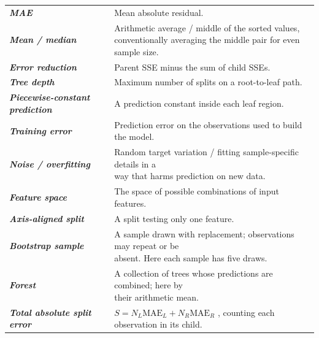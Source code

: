 \documentclass[10pt]{article}
\begin{document}
\begin{longtable}{l|l}
\textbf{\textit{MAE}} & Mean absolute residual. \\[1.5pt]
\textbf{\textit{Mean / median}} & \shortstack[l]{Arithmetic average / middle of the sorted values, \\ conventionally averaging the middle pair for even sample size.} \\[1.5pt]
\textbf{\textit{Error reduction}} & Parent SSE minus the sum of child SSEs. \\[1.5pt]
\textbf{\textit{Tree depth}} & Maximum number of splits on a root-to-leaf path. \\[1.5pt]
\textbf{\textit{Piecewise-constant prediction}} & A prediction constant inside each leaf region. \\[1.5pt]
\textbf{\textit{Training error}} & Prediction error on the observations used to build the model. \\[1.5pt]
\textbf{\textit{Noise / overfitting}} & \shortstack[l]{Random target variation / fitting sample-specific details in a \\ way that harms prediction on new data.} \\[1.5pt]
\textbf{\textit{Feature space}} & The space of possible combinations of input features. \\[1.5pt]
\textbf{\textit{Axis-aligned split}} & A split testing only one feature. \\[1.5pt]
\textbf{\textit{Bootstrap sample}} & \shortstack[l]{A sample drawn with replacement; observations may repeat or be \\ absent. Here each sample has five draws.} \\[1.5pt]
\textbf{\textit{Forest}} & \shortstack[l]{A collection of trees whose predictions are combined; here by \\ their arithmetic mean.} \\[1.5pt]
\textbf{\textit{Total absolute split error}} & \shortstack[l]{$S=N_L\mathrm{MAE}_L+N_R\mathrm{MAE}_R$ , counting each \\ observation in its child.} \\[1.5pt]
\end{longtable}
\endgroup
\end{document}
